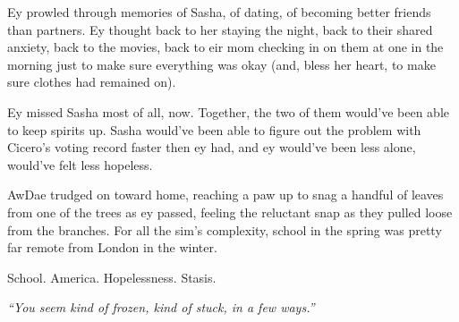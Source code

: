 Ey prowled through memories of Sasha, of dating, of becoming better friends than partners. Ey thought back to her staying the night, back to their shared anxiety, back to the movies, back to eir mom checking in on them at one in the morning just to make sure everything was okay (and, bless her heart, to make sure clothes had remained on).

Ey missed Sasha most of all, now. Together, the two of them would've been able to keep spirits up. Sasha would've been able to figure out the problem with Cicero's voting record faster then ey had, and ey would've been less alone, would've felt less hopeless.

AwDae trudged on toward home, reaching a paw up to snag a handful of leaves from one of the trees as ey passed, feeling the reluctant snap as they pulled loose from the branches. For all the sim's complexity, school in the spring was pretty far remote from London in the winter.

School. America. Hopelessness. Stasis.

\emph{``You seem kind of frozen, kind of stuck, in a few ways.''}

